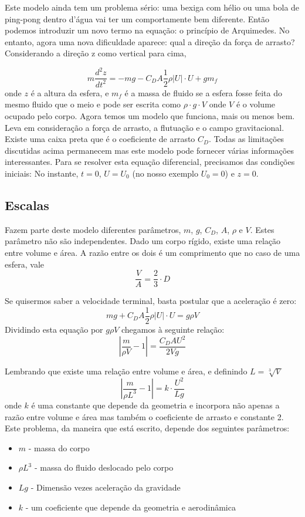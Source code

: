 \documentclass[article,12pt,oneside,a4paper,english,brazil,sumario=tradicional]{abntex2}
\begin{document}
Este modelo ainda tem um problema sério: uma bexiga com hélio ou uma bola de ping-pong dentro d'água vai ter um comportamente bem diferente. Então podemos introduzir um novo termo na equação: o princípio de Arquimedes. No entanto, agora uma nova dificuldade aparece: qual a direção da força de arrasto? Considerando a direção z como vertical para cima,

\[
m \frac{d^2 z}{dt^2} = -mg - C_D A \frac{1}{2} \rho |U|\cdot U + g m_f
\]
onde $z$ é a altura da esfera, e $m_f$ é a massa de fluido se a esfera fosse feita do mesmo fluido que o meio e pode ser escrita como $\rho\cdot g \cdot V$ onde $V$ é o volume ocupado pelo corpo. Agora temos um modelo que funciona, mais ou menos bem. Leva em consideração a força de arrasto, a flutuação e o campo gravitacional. Existe uma caixa preta que é o coeficiente de arrasto $C_D$. Todas as limitações discutidas acima permanecem mas este modelo pode fornecer várias informações interessantes. Para se resolver esta equação diferencial, precisamos das condições iniciais: No instante, $t=0$, $U=U_0$ (no nosso exemplo $U_0 = 0$) e $z=0$.

\subsection{Escalas}


Fazem parte deste modelo diferentes parâmetros, $m$, $g$, $C_D$, $A$, $\rho$ e  $V$. Estes parâmetro não são independentes. Dado um corpo rígido, existe uma relação entre volume e área. A razão entre os dois é um comprimento que no caso de uma esfera, vale
\[
\frac{V}{A} = \frac{2}{3}\cdot D
\]

Se quisermos saber a velocidade terminal, basta postular que a aceleração é zero:
\[
mg + C_D A \frac{1}{2} \rho |U|\cdot U  = g \rho V
\]
Dividindo esta equação por $g \rho V$ chegamos à seguinte relação:
\[
\left| \frac{m}{\rho V} - 1 \right| = \frac{C_D A U^2}{2 V g}
\]

Lembrando que existe uma relação entre volume e área, e definindo $L = \sqrt[3]{V}$
\[
\left| \frac{m}{\rho L^3} - 1 \right| = k \cdot \frac{U^2}{L g}
\]
onde $k$ é uma constante que depende da geometria e incorpora não apenas a razão entre volume e área mas também o coeficiente de arrasto e constante 2. Este problema, da maneira que está escrito, depende dos seguintes parâmetros:

\begin{itemize}
\item $m$ - massa do corpo
\item $\rho L^3$ - massa do fluido deslocado pelo corpo
\item $Lg$ - Dimensão vezes aceleração da gravidade
\item $k$ - um coeficiente que depende da geometria e aerodinâmica
\end{itemize}
\end{document}
